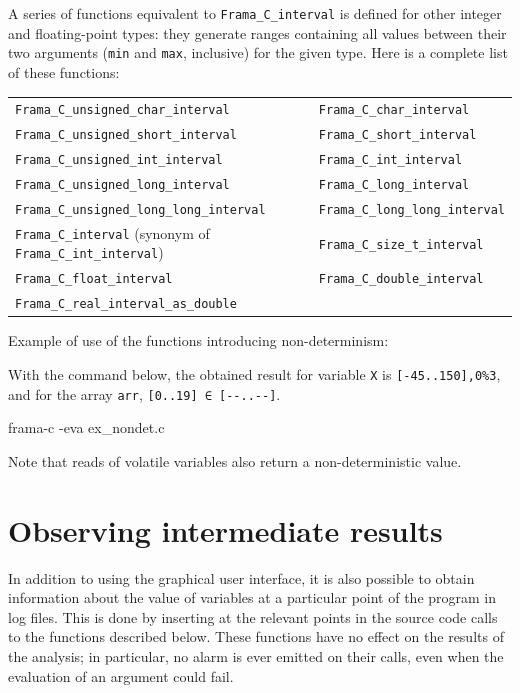 \documentclass{frama-c-book}
\begin{document}
A series of functions equivalent to \lstinline|Frama_C_interval|
is defined for other integer and floating-point types:
they generate ranges containing all values between their two arguments
(\texttt{min} and \texttt{max}, inclusive) for the given type.
Here is a complete list of these functions:

\begin{table}[!ht]
  \centering
  \begin{tabular}{ll}
    \lstinline|Frama_C_unsigned_char_interval| &
    \lstinline|Frama_C_char_interval| \\
    \lstinline|Frama_C_unsigned_short_interval| &
    \lstinline|Frama_C_short_interval| \\
    \lstinline|Frama_C_unsigned_int_interval| &
    \lstinline|Frama_C_int_interval| \\
    \lstinline|Frama_C_unsigned_long_interval| &
    \lstinline|Frama_C_long_interval| \\
    \lstinline|Frama_C_unsigned_long_long_interval| &
    \lstinline|Frama_C_long_long_interval| \\
    \lstinline|Frama_C_interval| (synonym of \lstinline|Frama_C_int_interval|) &
    \lstinline|Frama_C_size_t_interval| \\
    \lstinline|Frama_C_float_interval| &
    \lstinline|Frama_C_double_interval| \\
    \lstinline|Frama_C_real_interval_as_double|
  \end{tabular}
\end{table}

Example of use of the functions introducing non-determinism:

With the command below, the obtained result for
variable \lstinline|X| is \lstinline|[-45..150],0%3|, and for the
array \lstinline|arr|, \lstinline|[0..19] ∈ [--..--]|.
\begin{frama-c-commands}
frama-c -eva ex_nondet.c
\end{frama-c-commands}

Note that reads of volatile variables also return a non-deterministic
value.

\section{Observing intermediate results}
\label{builtins_observation}

In addition to using the graphical user interface, it is also possible
to obtain information about the value of variables at a particular
point of the program in log files. This is done by inserting at the
relevant points in the source code calls to the functions described below.
These functions have no effect on the results of the analysis; in particular,
no alarm is ever emitted on their calls, even when the evaluation of an
argument could fail.
\end{document}
